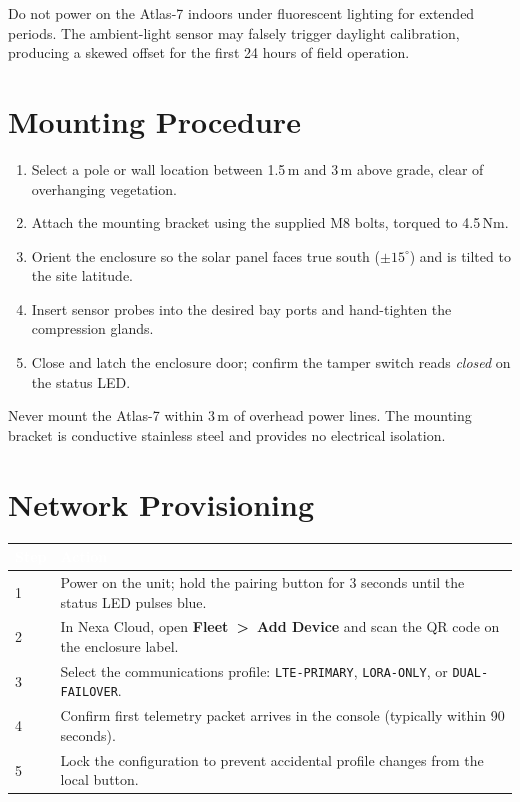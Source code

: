 \documentclass[11pt,a4paper,oneside,headings=big,chapterprefix=true]{scrreprt}
\begin{document}
\begin{warnbox}
Do not power on the Atlas-7 indoors under fluorescent lighting for extended periods. The ambient-light sensor may falsely trigger daylight calibration, producing a skewed offset for the first 24 hours of field operation.
\end{warnbox}

\section{Mounting Procedure}

\begin{enumerate}
  \item Select a pole or wall location between 1.5\,m and 3\,m above grade, clear of overhanging vegetation.
  \item Attach the mounting bracket using the supplied M8 bolts, torqued to 4.5\,N\textperiodcentered m.
  \item Orient the enclosure so the solar panel faces true south ($\pm 15^{\circ}$) and is tilted to the site latitude.
  \item Insert sensor probes into the desired bay ports and hand-tighten the compression glands.
  \item Close and latch the enclosure door; confirm the tamper switch reads \emph{closed} on the status LED.
\end{enumerate}

\begin{dangerbox}
Never mount the Atlas-7 within 3\,m of overhead power lines. The mounting bracket is conductive stainless steel and provides no electrical isolation.
\end{dangerbox}

\section{Network Provisioning}

\begin{center}
\renewcommand{\arraystretch}{1.25}
\begin{tabularx}{\textwidth}{@{}l X@{}}
\toprule
\rowcolor{steel}
\textcolor{white}{\bfseries Step} & \textcolor{white}{\bfseries Action} \\
\midrule
1 & Power on the unit; hold the pairing button for 3 seconds until the status LED pulses blue. \\
\rowcolor{fogbg}
2 & In Nexa Cloud, open \textbf{Fleet~\textgreater~Add Device} and scan the QR code on the enclosure label. \\
3 & Select the communications profile: \texttt{LTE-PRIMARY}, \texttt{LORA-ONLY}, or \texttt{DUAL-FAILOVER}. \\
\rowcolor{fogbg}
4 & Confirm first telemetry packet arrives in the console (typically within 90 seconds). \\
5 & Lock the configuration to prevent accidental profile changes from the local button. \\
\bottomrule
\end{tabularx}
\end{center}
\end{document}

